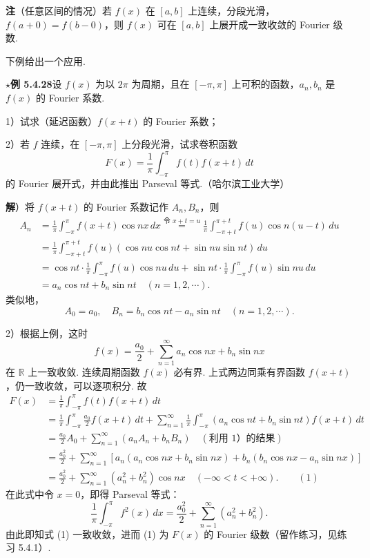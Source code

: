 \documentclass[UTF8,12pt,a4paper,fontset=fandol]{ctexart}
\providecommand{\xlongequal}[1]{\stackrel{#1}{=}}
\begin{document}
\noindent\textbf{注}\quad （任意区间的情况）若 $f(x)$ 在 $[a,b]$ 上连续，分段光滑，$f(a+0)=f(b-0)$，则
$f(x)$ 可在 $[a,b]$ 上展开成一致收敛的 Fourier 级数.

下例给出一个应用.

\noindent\(\star\)\textbf{例 5.4.28}\quad 设 $f(x)$ 为以 $2\pi$ 为周期，且在 $[-\pi,\pi]$ 上可积的函数，$a_n,b_n$ 是
$f(x)$ 的 Fourier 系数.

1）试求（延迟函数）$f(x+t)$ 的 Fourier 系数；

2）若 $f$ 连续，在 $[-\pi,\pi]$ 上分段光滑，试求卷积函数
\[
  F(x)=\frac1\pi\int_{-\pi}^{\pi}f(t)f(x+t)\,dt
\]
的 Fourier 展开式，并由此推出 Parseval 等式.（哈尔滨工业大学）

\noindent\textbf{解}）将 $f(x+t)$ 的 Fourier 系数记作 $A_n,B_n$，则
\[
\begin{aligned}
A_n&=\frac1\pi\int_{-\pi}^{\pi}f(x+t)\cos nx\,dx
\xlongequal{\text{令 }x+t=u}
\frac1\pi\int_{-\pi+t}^{\pi+t}f(u)\cos n(u-t)\,du\\
&=\frac1\pi\int_{-\pi+t}^{\pi+t}f(u)(\cos nu\cos nt+\sin nu\sin nt)\,du\\
&=\cos nt\cdot\frac1\pi\int_{-\pi}^{\pi}f(u)\cos nu\,du
+\sin nt\cdot\frac1\pi\int_{-\pi}^{\pi}f(u)\sin nu\,du\\
&=a_n\cos nt+b_n\sin nt\quad(n=1,2,\cdots).
\end{aligned}
\]
类似地，
\[
  A_0=a_0,\quad B_n=b_n\cos nt-a_n\sin nt\quad(n=1,2,\cdots).
\]

2）根据上例，这时
\[
  f(x)=\frac{a_0}{2}+\sum_{n=1}^{\infty}a_n\cos nx+b_n\sin nx
\]
在 $\mathbb R$ 上一致收敛. 连续周期函数 $f(x)$ 必有界. 上式两边同乘有界函数 $f(x+t)$，仍一致收敛，可以逐项积分. 故
\[
\begin{aligned}
F(x)&=\frac1\pi\int_{-\pi}^{\pi}f(t)f(x+t)\,dt\\
&=\frac1\pi\int_{-\pi}^{\pi}\frac{a_0}{2}f(x+t)\,dt
+\sum_{n=1}^{\infty}\frac1\pi\int_{-\pi}^{\pi}(a_n\cos nt+b_n\sin nt)f(x+t)\,dt\\
&=\frac{a_0}{2}A_0+\sum_{n=1}^{\infty}(a_nA_n+b_nB_n)\quad(\text{利用 1）的结果})\\
&=\frac{a_0^2}{2}+\sum_{n=1}^{\infty}
[a_n(a_n\cos nx+b_n\sin nx)+b_n(b_n\cos nx-a_n\sin nx)]\\
&=\frac{a_0^2}{2}+\sum_{n=1}^{\infty}(a_n^2+b_n^2)\cos nx\quad(-\infty<t<+\infty). \qquad(1)
\end{aligned}
\]
在此式中令 $x=0$，即得 Parseval 等式：
\[
  \frac1\pi\int_{-\pi}^{\pi}f^2(x)\,dx
  =\frac{a_0^2}{2}+\sum_{n=1}^{\infty}(a_n^2+b_n^2).
\]
由此即知式 (1) 一致收敛，进而 (1) 为 $F(x)$ 的 Fourier 级数（留作练习，见练习 5.4.1）.
\end{document}
